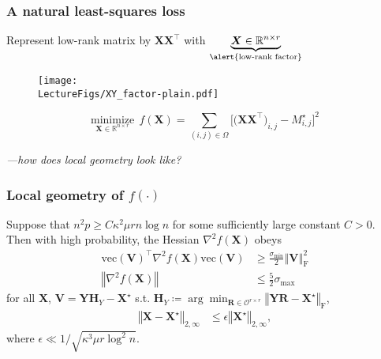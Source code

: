 \documentclass[compress,
mathserif,wide,%
]{beamer}
\begin{document}
\begin{frame}
\frametitle{A natural least-squares loss }

\bigskip

  Represent low-rank matrix by $\bm{X}\bm{X}^{\top}$ with $\underset{\alert{\text{low-rank factor}}}{\underbrace{\bm{X} \in \mathbb{R}^{n \times r}}}$ 


\begin{figure}
  \texttt{[image: \\LectureFigs/XY\_factor-plain.pdf]}
\end{figure}

\vfill
{


\begin{varblock}[\textwidth]{}
\[
  \underset{\bm{X} \in \mathbb{R}^{n \times r}}{\text{minimize}}~~ f(\bm{X})=  \sum_{(i,j)\in\Omega}\Big[ \big( \bm{X}\bm{X}^{\top} \big)_{i,j} - M^\star_{i,j} \Big]^{2} 
\]  
\end{varblock}
}

{\hfill \em ---how does local geometry look like?}
\end{frame}


\begin{frame}
	\frametitle{Local geometry of $f(\cdot)$}
\begin{lemma}Suppose that $n^{2}p\geq C\kappa^{2}\mu rn\log n$ for some sufficiently large
constant $C>0$. Then with high probability,
the Hessian $\nabla^{2}f(\bm{X})$ obeys 
\begin{align*}
\mathrm{vec}\left(\bm{V}\right)^{\top}\nabla^{2}f\left(\bm{X}\right)\mathrm{vec}\left(\bm{V}\right) & \geq\frac{\sigma_{\min}}{2}\left\Vert \bm{V}\right\Vert _{\mathrm{F}}^{2}\\ 
\left\Vert \nabla^{2}f\left(\bm{X}\right)\right\Vert &\leq\frac{5}{2}\sigma_{\max}
\end{align*}
for all $\bm{X}$, \alert{$\bm{V} = \bm{Y}\bm{H}_{Y}-\bm{X}^\star$} s.t. $\bm{H}_{Y} \coloneqq \arg\min_{\bm{R}\in\mathcal{O}^{r\times r}}\left\Vert \bm{Y}\bm{R}-\bm{X}^\star\right\Vert _{\mathrm{F}}$,
\alert{\begin{align*}
 \left\Vert \bm{X}-\bm{X}^{\star}\right\Vert _{2,\infty} & \leq\epsilon\left\Vert \bm{X}^{\star}\right\Vert _{2,\infty},
\end{align*}}
where $\epsilon\ll1/\sqrt{\kappa^{3}\mu r\log^{2}n}$.

\end{lemma}
\end{frame}
\end{document}
